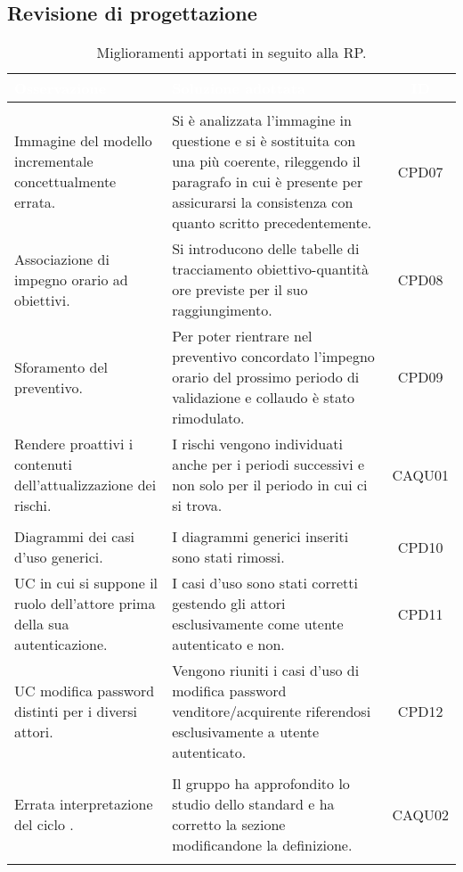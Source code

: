 \subsection{Revisione di progettazione}
\begin{longtable}{|C{4cm}|C{9cm}|c|}
	\textcolor{white}{\textbf{Osservazione}}&
	\textcolor{white}{\textbf{Soluzione adottata}}&
	\textcolor{white}{\textbf{ID}}\label{tab:CriticitàRP}\\ \hline
	\\ \hline
	Immagine del modello incrementale concettualmente errata. & Si è analizzata l'immagine in questione e si è sostituita con una più coerente, rileggendo il paragrafo in cui è presente per assicurarsi la consistenza con quanto scritto precedentemente. & CPD07  \\ \hline
	Associazione di impegno orario ad obiettivi. & Si introducono delle tabelle di tracciamento obiettivo-quantità ore previste per il suo raggiungimento. & CPD08 \\ \hline
	Sforamento del preventivo. & Per poter rientrare nel preventivo concordato l'impegno orario del prossimo periodo di validazione e collaudo è stato rimodulato. & CPD09 \\ \hline
	Rendere proattivi i contenuti dell'attualizzazione dei rischi. & I rischi vengono individuati anche per i periodi successivi e non solo per il periodo in cui ci si trova. & CAQU01 \\ \hline
	\\ \hline
	Diagrammi dei casi d'uso generici. & I diagrammi generici inseriti sono stati rimossi. & CPD10  \\ \hline
	UC in cui si suppone il ruolo dell'attore prima della sua autenticazione. & I casi d'uso sono stati corretti gestendo gli attori esclusivamente come utente autenticato e non. & CPD11 \\ \hline
	UC modifica password distinti per i diversi attori. & Vengono riuniti i casi d'uso di modifica password venditore/acquirente riferendosi esclusivamente a utente autenticato. & CPD12 \\ \hline
	\\ \hline
	Errata interpretazione del ciclo . & Il gruppo ha approfondito lo studio dello standard e ha corretto la sezione modificandone la definizione. & CAQU02 \\ \hline
	\caption{Miglioramenti apportati in seguito alla RP.}\\
\end{longtable}